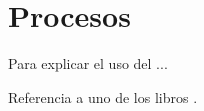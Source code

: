 \section{Procesos} \label{sect:procesos}

Para explicar el uso del ...

Referencia a uno de los libros \cite{S09}.
